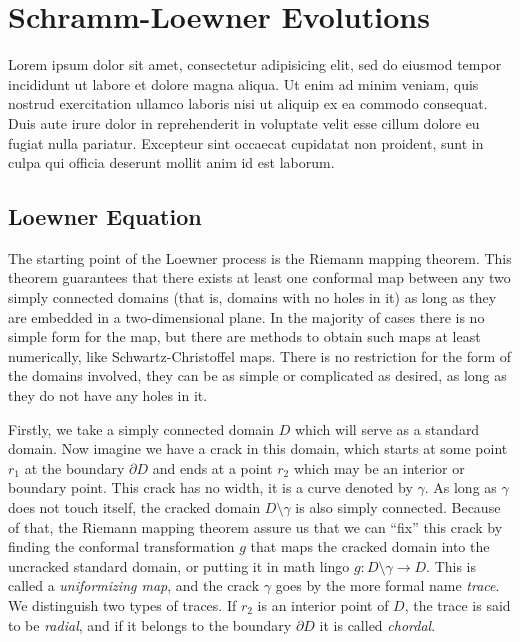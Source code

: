 \chapter{Schramm-Loewner Evolutions}
\label{ch4-sle}

Lorem ipsum dolor sit amet, consectetur adipisicing elit, sed do eiusmod tempor
incididunt ut labore et dolore magna aliqua. Ut enim ad minim veniam, quis
nostrud exercitation ullamco laboris nisi ut aliquip ex ea commodo consequat.
Duis aute irure dolor in reprehenderit in voluptate velit esse cillum dolore eu
fugiat nulla pariatur. Excepteur sint occaecat cupidatat non proident, sunt in
culpa qui officia deserunt mollit anim id est laborum.

\section{Loewner Equation}
\label{sec:le}


The starting point of the Loewner process is the Riemann mapping theorem. This
theorem guarantees that there exists at least one conformal map between any two
simply connected domains (that is, domains with no holes in it) as long as they
are embedded in a two-dimensional plane. In the majority of cases there is no
simple form for the map, but there are methods to obtain such maps at least
numerically, like Schwartz-Christoffel maps. There is no restriction for the
form of the domains involved, they can be as simple or complicated as desired,
as long as they do not have any holes in it.

Firstly, we take a simply connected domain $D$ which will serve as a standard
domain. Now imagine we have a crack in this domain, which starts at some point
$r_1$ at the boundary $\partial D$ and ends at a point $r_2$ which may be an
interior or boundary point. This crack has no width, it is a curve denoted by
$\gamma$. As long as $\gamma$ does not touch itself, the cracked domain
$D\setminus\gamma$ is also simply connected. Because of that, the Riemann
mapping theorem assure us that we can ``fix'' this crack by finding the
conformal transformation $g$ that maps the cracked domain into the uncracked
standard domain, or putting it in math lingo $g:D\setminus\gamma\rightarrow D$.
This is called a \textit{uniformizing map}, and the crack  $\gamma$ goes by the
more formal name \textit{trace}. We distinguish two types of traces. If $r_2$
is an interior point of $D$, the trace is said to be \textit{radial}, and if it
belongs to the boundary $\partial D$ it is called \textit{chordal}.

